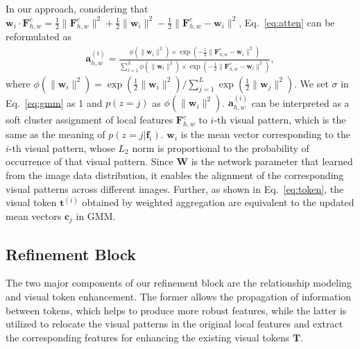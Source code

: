 \documentclass[letterpaper]{article} \usepackage{aaai22}  \usepackage{times}  \usepackage{helvet}  \usepackage{courier}  \usepackage[hyphens]{url}  \usepackage{graphicx} \urlstyle{rm} \def\UrlFont{\rm}  \usepackage{natbib}  \usepackage{caption} \DeclareCaptionStyle{ruled}{labelfont=normalfont,labelsep=colon,strut=off} \frenchspacing  \setlength{\pdfpagewidth}{8.5in}  \setlength{\pdfpageheight}{11in}  \usepackage{algorithm}
\begin{document}
In our approach, considering that $\mathbf{w}_{i} \cdot \bm{F}^c_{h,w} = \frac{1}{2}\| \bm{F}^c_{h,w}\|^2 + \frac{1}{2}\|\mathbf{w}_i\|^2 - \frac{1}{2}\| \bm{F}^c_{h,w} - \mathbf{w}_i\|^2$, Eq.~\eqref{eq:atten} can be reformulated as
\begin{eqnarray}\label{eq:re_atten}
	\bm{a}^{(i)}_{h,w} =\frac{\phi\left(\|\mathbf{w}_i\|^2\right) \times \exp\left( -\frac{1}{2} \| \bm{F}^c_{h,w} - \mathbf{w}_i \|^2\right)}{\sum_{l=1}^{L}\phi\left(\|\mathbf{w}_l\|^2\right) \times \exp\left( -\frac{1}{2}\| \bm{F}^c_{h,w} - \mathbf{w}_l\|^2\right)},
\end{eqnarray}
where $\phi\left(\|\mathbf{w}_i\|^2\right) = \exp(\frac{1}{2}\| \mathbf{w}_i\|^2) / \sum_{j=1}^{L}\exp(\frac{1}{2}\| \mathbf{w}_j\|^2)$.
We set $\sigma$ in Eq.~\eqref{eq:gmm} as 1 and $p(z=j)$ as $\phi\left(\|\mathbf{w}_i\|^2\right)$. $\bm{a}^{(i)}_{h,w}$ can be interpreted as a soft cluster assignment of local features $\bm{F}^c_{h,w}$ to $i$-th visual pattern, which is the same as the meaning of $p(z=j | \bm{f}_i)$. $\mathbf{w}_i$ is the mean vector corresponding to the $i$-th visual pattern, whose $L_2$ norm is proportional to the probability of occurrence of that visual pattern. Since $\mathbf{W}$ is the network parameter that learned from the image data distribution, it enables the alignment of the corresponding visual patterns across different images.
Further, as shown in Eq.~\eqref{eq:token}, the visual token $\bm{t}^{(i)}$ obtained by weighted aggregation are equivalent to the updated mean vectors $\mathbf{c}_j$ in GMM.

\subsection{Refinement Block}
The two major components of our refinement block are the relationship modeling and visual token enhancement. The former allows the propagation of information between tokens, which helps to produce more robust features, while the latter is utilized to relocate the visual patterns in the original local features and extract the corresponding features for enhancing the existing visual tokens $\bm{T}$.
\end{document}
